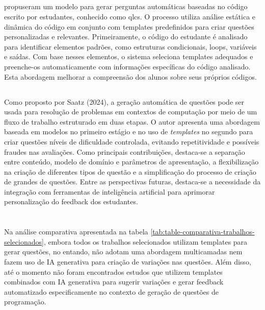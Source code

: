 \subsection{}
\cite {lehtinen2021} propuseram um modelo para gerar perguntas automáticas baseadas no código escrito por estudantes, conhecido como  \gls{qlcs}. O processo utiliza análise estática e dinâmica do código em conjunto com templates predefinidos para criar questões personalizadas e relevantes. Primeiramente, o código do estudante é analisado para identificar elementos padrões, como estruturas condicionais, loops, variáveis e saídas. Com base nesses elementos, o sistema seleciona templates adequados e preenche-os automaticamente com informações específicas do código analisado. Esta abordagem melhorar a compreensão dos alunos sobre seus próprios códigos. 

 \subsection{}
Como proposto por Saatz (2024), a geração automática de questões pode ser usada para resolução de problemas em contextos de computação  por meio de um fluxo de trabalho estruturado em duas etapas. O autor apresenta uma abordagem baseada em modelos no primeiro estágio e no uso de \textit{templates}  no segundo para criar questões níveis de dificuldade controlada, evitando repetitividade e possíveis fraudes nas avaliações. Como principais contribuições, destaca-se a separação entre conteúdo, modelo de domínio e parâmetros de apresentação, a flexibilização na criação de diferentes tipos de questão e a simplificação do processo de criação de grandes de questões. Entre as perspectivas futuras, destaca-se a necessidade da integração com ferramentas de inteligência artificial para aprimorar personalização do feedback dos estudantes. 


\section{}

Na análise comparativa apresentada na tabela \ref{tab:table-comparativa-trabalhos-selecionados}, embora todos os trabalhos selecionados utilizam templates para gerar questões, no entando, não adotam uma abordagem multicamadas nem fazem uso de IA generativa para criação de variações nas questões. Além disso, até o momento não foram encontrados estudos que utilizem templates combinados com IA generativa para sugerir variações e gerar feedback automatizado especificamente no contexto de geração de questões de programação. 

